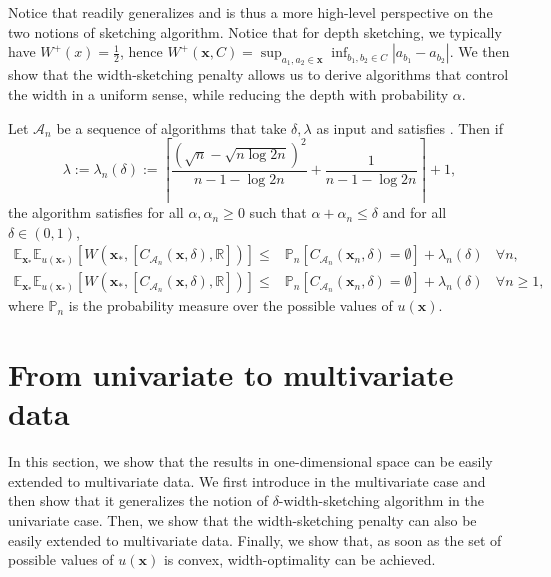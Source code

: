 \documentclass{article} %
\theoremstyle{remark}
\theoremstyle{definition}      %
\begin{document}
Notice that  readily generalizes  and is thus a more high-level perspective on the two notions of sketching algorithm. Notice that for depth sketching, we typically have $W^{\plus}(x) = \frac{1}{2}$, hence $W^+(\bm{x},C) = \sup_{a_1,a_2 \in \bm{x}} \inf_{b_1,b_2 \in C} |a_{b_1} - a_{b_2}|$. We then show that the width-sketching penalty allows us to derive algorithms that control the width in a uniform sense, while reducing the depth with probability $\alpha$.
\begin{theorem}\label{thm:width_control}
  Let $\mathcal{A}_n$ be a sequence of algorithms that take $\delta,\lambda$ as input and satisfies . Then if
  \begin{equation}
    \lambda :=\lambda_n(\delta) := \left\lceil \frac{(\sqrt{n} - \sqrt{n \log 2n})^2}{n - 1 - \log 2n} + \frac{1}{n - 1 - \log 2n}\right \rceil + 1,
  \end{equation}
  the algorithm satisfies for all $\alpha,\alpha_n \geq 0$ such that $\alpha + \alpha_n \leq \delta$ and for all $\delta \in (0,1)$,  
  \begin{align}
    \mathbb{E}_{\bm{x}_*}\mathbb{E}_{u(\bm{x_*})}\left[W(\bm{x_*},[C_{\mathcal{A}_n}(\bm{x},\delta),\mathbb{R}])\right] \leq & \mathbb{P}_n[C_{\mathcal{A}_n}(\bm{x}_n,\delta) = \emptyset] + \lambda_n(\delta) ~~~~ \forall n, \\
    \mathbb{E}_{\bm{x}_*}\mathbb{E}_{u(\bm{x_*})}\left[W(\bm{x_*},[C_{\mathcal{A}_n}(\bm{x},\delta),\mathbb{R}])\right] \leq & \mathbb{P}_n[C_{\mathcal{A}_n}(\bm{x}_n,\delta) = \emptyset] + \lambda_n(\delta)  ~~~~ \forall n \geq 1,
  \end{align} 
  where $\mathbb{P}_n$ is the probability measure over the possible values of $u(\bm{x})$.
\end{theorem}




\section{From univariate to multivariate data}

In this section, we show that the results in one-dimensional space can be easily extended to multivariate data. We first introduce  in the multivariate case and then show that it generalizes the notion of $\delta$-width-sketching algorithm in the univariate case. Then, we show that the width-sketching penalty can also be easily extended to multivariate data. Finally, we show that, as soon as the set of possible values of $u(\bm{x})$ is convex, width-optimality can be achieved.
\end{document}
